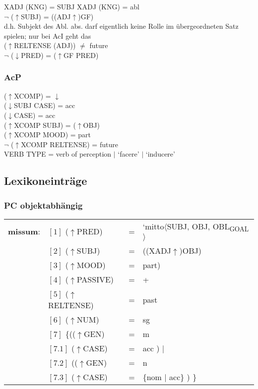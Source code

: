 \documentclass[12pt,a4paper]{article}
\begin{document}
XADJ (KNG) = SUBJ XADJ (KNG) = abl\\
$\neg$ ($\uparrow$SUBJ) = ((ADJ$\uparrow$)GF) \\
d.h. Subjekt des Abl. abs. darf eigentlich keine Rolle im übergeordneten Satz spielen; nur bei AcI geht das\\
($\uparrow$RELTENSE (ADJ)) $\neq$ future \\
$\neg$ ($\downarrow$PRED) = ($\uparrow$GF PRED)\\

\subsubsection{AcP}

($\uparrow$XCOMP) = $\downarrow$\\
($\downarrow$SUBJ CASE) = acc\\
($\downarrow$CASE) = acc\\
($\uparrow$XCOMP SUBJ) = ($\uparrow$OBJ)\\
($\uparrow$XCOMP MOOD) = part\\
$\neg$ ($\uparrow$XCOMP RELTENSE) = future\\
VERB TYPE = verb of perception $\mid$ `facere' $\mid$ `inducere'

\subsection{Lexikoneinträge}

\subsubsection{PC objektabhängig}

\begin{tabular}{ l  l  l  l  } 
\textbf{missum}: & $[1]$ \:  ($\uparrow$PRED) & = & `mitto$\langle$SUBJ, OBJ, OBL\textsubscript{GOAL} $\rangle$\\
$\qquad$ & $[2]$ \:  ($\uparrow$SUBJ) & = & ((XADJ$\uparrow$)OBJ)\\
$\qquad$ & $[3]$ \:  ($\uparrow$MOOD) & = & part)\\
$\qquad$ & $[4]$ \:  ($\uparrow$PASSIVE) & = & + \\
$\qquad$ & $[5]$ \:  ($\uparrow$RELTENSE) & = & past \\
$\qquad$ & $[6]$ \:  ($\uparrow$NUM) & = & sg \\
$\qquad$ & $[7]$ \:  \{(($\uparrow$GEN) & = & m \\ 
$\qquad$ & $[7.1]$ \:  ($\uparrow$CASE) & = & acc ) $\mid$\\
$\qquad$ & $[7.2]$ \: (($\uparrow$GEN) & = & n \\
$\qquad$ & $[7.3]$ \:  ($\uparrow$CASE) & = & \{nom $\mid$ acc\} ) \}\\
\end{tabular}
\newline
\newline
\end{document}
